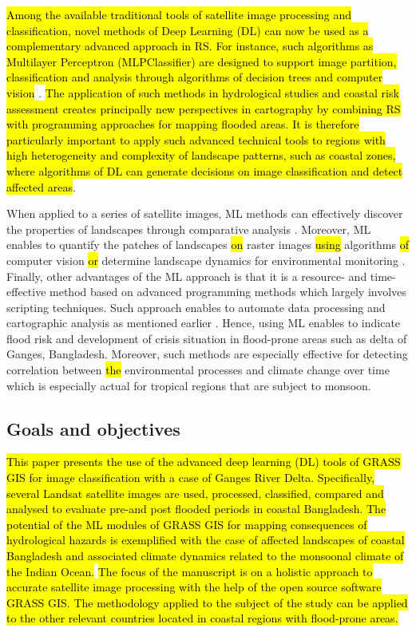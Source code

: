 \documentclass[water,article,submit,pdftex,moreauthors]{Definitions/mdpi}
\begin{document}
\hl{Among the available traditional tools of satellite image processing and classification, novel methods of Deep Learning (DL) can now be used as a complementary advanced approach in RS. For instance, such algorithms as Multilayer Perceptron (MLPClassifier) are designed to support image partition, classification and analysis through algorithms of decision trees and computer vision} \cite{6493388,6422192,7507955}. \hl{The application of such methods in hydrological studies and coastal risk assessment creates principally new perspectives in cartography by combining RS with programming approaches for mapping flooded areas. It is therefore particularly important to apply such advanced technical tools to regions with high heterogeneity and complexity of landscape patterns, such as coastal zones, where algorithms of DL can generate decisions on image classification and detect affected areas}. 

When applied to a series of satellite images, ML methods can effectively discover the properties of landscapes through comparative analysis \cite{9324433,Lemenkova202313}. Moreover, ML enables to quantify the patches of landscapes \hl{on} raster images \hl{using} algorithms \hl{of} computer vision  \cite{10281789,jmse11040871,8899013,Lemenkova202021,9333522} \hl{or} determine landscape dynamics for environmental monitoring \cite{9392684,Lemenkova202324}. Finally, other advantages of the ML approach is that it is a resource- and time-effective method based on advanced programming methods which largely involves scripting techniques. Such approach enables to automate data processing and cartographic analysis as mentioned earlier \cite{10282693,Lemenkova202301,10441504}. Hence, using ML enables to indicate flood risk and\hl{ }development of crisis situation in flood-prone areas such as delta of Ganges, Bangladesh. Moreover, such methods are especially effective for detecting correlation between \hl{the }environmental processes and climate change over time which is especially actual for tropical regions that are subject to monsoon. 

\subsection{Goals and objectives}

\hl{This paper presents the use of the advanced deep learning (DL) tools of GRASS GIS for image classification with a case of Ganges River Delta. Specifically, several Landsat satellite images are used, processed, classified, compared and analysed to evaluate pre-and post flooded periods in coastal Bangladesh. The potential of the ML modules of GRASS GIS for mapping consequences of hydrological hazards is exemplified with the case of affected landscapes of coastal Bangladesh and associated climate dynamics related to the monsoonal climate of the Indian Ocean.} \hl{The focus of the manuscript is on a holistic approach to accurate satellite image processing with the help of the open source software GRASS GIS. The methodology applied to the subject of the study can be applied to the other relevant countries located in coastal regions with flood-prone areas.}
\end{document}

